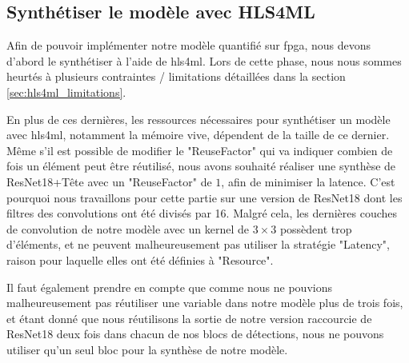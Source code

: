 \subsection{Synthétiser le modèle avec HLS4ML}
\label{subsec:r18_synthetize_with_hls4ml}

Afin de pouvoir implémenter notre modèle quantifié sur \acrshort{fpga}, nous devons d'abord le synthétiser à l'aide de \acrshort{hls4ml}. Lors de cette phase, nous nous sommes heurtés à plusieurs contraintes / limitations détaillées dans la section \ref{sec:hls4ml_limitations}.

En plus de ces dernières, les ressources nécessaires pour synthétiser un modèle avec \acrshort{hls4ml}, notamment la mémoire vive, dépendent de la taille de ce dernier. Même s'il est possible de modifier le "ReuseFactor" qui va indiquer combien de fois un élément peut être réutilisé, nous avons souhaité réaliser une synthèse de ResNet18+Tête avec un "ReuseFactor" de $1$, afin de minimiser la latence. C'est pourquoi nous travaillons pour cette partie sur une version de ResNet18 dont les filtres des convolutions ont été divisés par 16. Malgré cela, les dernières couches de convolution de notre modèle avec un kernel de $3 \times 3$ possèdent trop d'éléments, et ne peuvent malheureusement pas utiliser la stratégie "Latency", raison pour laquelle elles ont été définies à "Resource".

Il faut également prendre en compte que comme nous ne pouvions malheureusement pas réutiliser une variable dans notre modèle plus de trois fois, et étant donné que nous réutilisons la sortie de notre version raccourcie de ResNet18 deux fois dans chacun de nos blocs de détections, nous ne pouvons utiliser qu’un seul bloc pour la synthèse de notre modèle.

